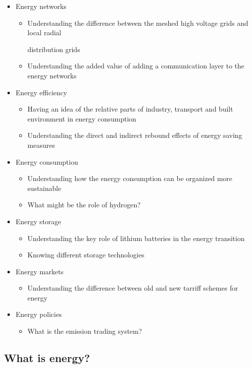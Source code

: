 \documentclass[../summary.tex]{subfiles}
\begin{document}
\begin{itemize}
		\item Energy networks
		\begin{itemize}
			\item Understanding the difference between the meshed high voltage grids and local radial 
			
			distribution grids
			\item Understanding the added value of adding a communication layer to the energy networks
		\end{itemize}
		
		\item Energy efficiency
		\begin{itemize}
			\item Having an idea of the relative parts of industry, transport and built environment in energy consumption
			\item Understanding the direct and indirect rebound effects of energy saving measures
		\end{itemize}
		
		\item Energy consumption
		\begin{itemize}
			\item Understanding how the energy consumption can be organized more sustainable
			\item What might be the role of hydrogen?
		\end{itemize}
		
		\item Energy storage
		\begin{itemize}
			\item Understanding the key role of lithium batteries in the energy transition
			\item Knowing different storage technologies
		\end{itemize}
		
		\item Energy markets
		\begin{itemize}
			\item Understanding the difference between old and new tarriff schemes for energy
		\end{itemize}
		
		\item Energy policies
		\begin{itemize}
			\item What is the emission trading system?
		\end{itemize}
	\end{itemize}
	\newpage
	\subsection{What is energy?}
	
\end{document}
